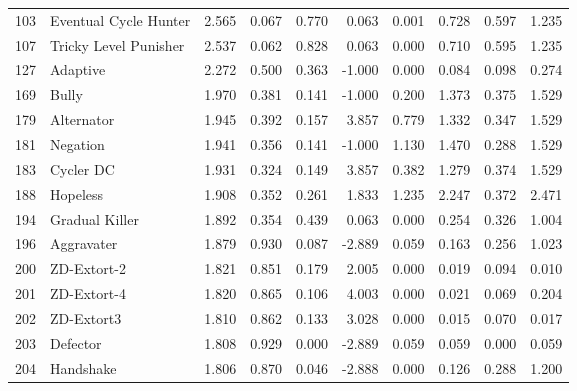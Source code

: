 \begin{tabular}{rlrrrrrrrr}
  103 &  Eventual Cycle Hunter &           2.565 &       0.067 &    0.770 &          0.063 &          0.001 &         0.728 &        0.597 &           1.235 \\
  107 &  Tricky Level Punisher &           2.537 &       0.062 &    0.828 &          0.063 &          0.000 &         0.710 &        0.595 &           1.235 \\
  127 &               Adaptive &           2.272 &       0.500 &    0.363 &         -1.000 &          0.000 &         0.084 &        0.098 &           0.274 \\
  169 &                  Bully &           1.970 &       0.381 &    0.141 &         -1.000 &          0.200 &         1.373 &        0.375 &           1.529 \\
  179 &             Alternator &           1.945 &       0.392 &    0.157 &          3.857 &          0.779 &         1.332 &        0.347 &           1.529 \\
  181 &               Negation &           1.941 &       0.356 &    0.141 &         -1.000 &          1.130 &         1.470 &        0.288 &           1.529 \\
  183 &              Cycler DC &           1.931 &       0.324 &    0.149 &          3.857 &          0.382 &         1.279 &        0.374 &           1.529 \\
  188 &               Hopeless &           1.908 &       0.352 &    0.261 &          1.833 &          1.235 &         2.247 &        0.372 &           2.471 \\
  194 &         Gradual Killer &           1.892 &       0.354 &    0.439 &          0.063 &          0.000 &         0.254 &        0.326 &           1.004 \\
  196 &             Aggravater &           1.879 &       0.930 &    0.087 &         -2.889 &          0.059 &         0.163 &        0.256 &           1.023 \\
  200 &            ZD-Extort-2 &           1.821 &       0.851 &    0.179 &          2.005 &          0.000 &         0.019 &        0.094 &           0.010 \\
  201 &            ZD-Extort-4 &           1.820 &       0.865 &    0.106 &          4.003 &          0.000 &         0.021 &        0.069 &           0.204 \\
  202 &             ZD-Extort3 &           1.810 &       0.862 &    0.133 &          3.028 &          0.000 &         0.015 &        0.070 &           0.017 \\
  203 &               Defector &           1.808 &       0.929 &    0.000 &         -2.889 &          0.059 &         0.059 &        0.000 &           0.059 \\
  204 &              Handshake &           1.806 &       0.870 &    0.046 &         -2.888 &          0.000 &         0.126 &        0.288 &           1.200 \\
\bottomrule
\end{tabular}
